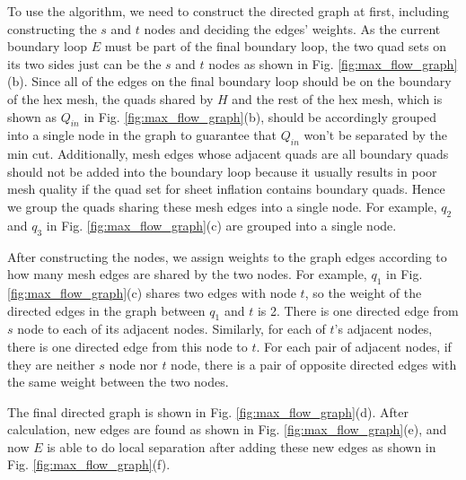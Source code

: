 \documentclass[final,5p,times,twocolumn]{elsarticle}
\begin{document}
To use the algorithm, we need to construct the directed graph at first, including constructing the $s$ and $t$ nodes and deciding the edges' weights. As the current boundary loop $E$ must be part of the final boundary loop, the two quad sets on its two sides just can be the $s$ and $t$ nodes as shown in Fig. \ref{fig:max_flow_graph}(b). Since all of the edges on the final boundary loop should be on the boundary of the hex mesh, the quads shared by $H$ and the rest of the hex mesh, which is shown as $Q_{in}$ in Fig. \ref{fig:max_flow_graph}(b), should be accordingly grouped into a single node in the graph to guarantee that $Q_{in}$ won't be separated by the min cut. Additionally, mesh edges whose adjacent quads are all boundary quads should not be added into the boundary loop because it usually results in poor mesh quality if the quad set for sheet inflation contains boundary quads. Hence we group the quads sharing these mesh edges into a single node. For example, $q_2$ and $q_3$ in Fig. \ref{fig:max_flow_graph}(c) are grouped into a single node.

After constructing the nodes, we assign weights to the graph edges according to how many mesh edges are shared by the two nodes. For example, $q_1$ in Fig. \ref{fig:max_flow_graph}(c) shares two edges with node $t$, so the weight of the directed edges in the graph between $q_1$ and $t$ is 2. There is one directed edge from $s$ node to each of its adjacent nodes. Similarly, for each of $t$'s adjacent nodes, there is one directed edge from this node to $t$. For each pair of adjacent nodes, if they are neither $s$ node nor $t$ node, there is a pair of opposite directed edges with the same weight between the two nodes.

The final directed graph is shown in Fig. \ref{fig:max_flow_graph}(d). After calculation, new edges are found as shown in Fig. \ref{fig:max_flow_graph}(e), and now $E$ is able to do local separation after adding these new edges as shown in  Fig. \ref{fig:max_flow_graph}(f).
\end{document}
